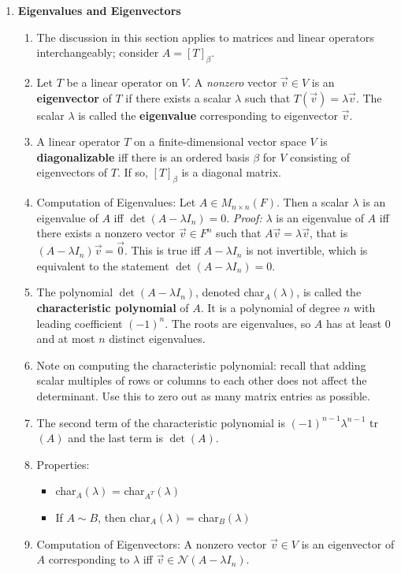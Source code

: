 \documentclass[10pt]{article}
\begin{document}
\begin{multicols*}{2}
\begin{enumerate}
    \item \textbf{Eigenvalues and Eigenvectors}
    \begin{enumerate}
        \item The discussion in this section applies to matrices and linear operators interchangeably; consider $A=[T]_\beta$.
        \item Let $T$ be a linear operator on $V$. A \textit{nonzero} vector $\vec{v} \in V$ is an \textbf{eigenvector} of $T$ if there exists a scalar $\lambda$ such that $T(\vec{v}) = \lambda \vec{v}$. The scalar $\lambda$ is called the \textbf{eigenvalue} corresponding to eigenvector $\vec{v}$.
        \item A linear operator $T$ on a finite-dimensional vector space $V$ is \textbf{diagonalizable} iff there is an ordered basis $\beta$ for $V$ consisting of eigenvectors of $T$. If so, $[T]_\beta$ is a diagonal matrix.
        \item Computation of Eigenvalues: Let $A \in M_{n \times n}(F)$. Then a scalar $\lambda$ is an eigenvalue of $A$ iff $\det(A - \lambda I_n)=0$. \textit{Proof:} $\lambda$ is an eigenvalue of $A$ iff there exists a nonzero vector $\vec{v} \in F^n$ such that $A\vec{v} = \lambda \vec{v}$, that is $(A - \lambda I_n)\vec{v}=\vec{0}$. This is true iff $A - \lambda I_n$ is not invertible, which is equivalent to the statement $\det(A - \lambda I_n)=0$.
        \item The polynomial $\det(A - \lambda I_n)$, denoted char$_A(\lambda)$, is called the \textbf{characteristic polynomial} of $A$. It is a polynomial of degree $n$ with leading coefficient $(-1)^n$. The roots are eigenvalues, so $A$ has at least 0 and at most $n$ distinct eigenvalues.
        \item Note on computing the characteristic polynomial: recall that adding scalar multiples of rows or columns to each other does not affect the determinant. Use this to zero out as many matrix entries as possible. 
        \item The second term of the characteristic polynomial is $(-1)^{n-1} \lambda^{n-1}$ tr$(A)$ and the last term is $\det(A)$.
        \item Properties:
        \begin{itemize}
            \item char$_A(\lambda)$ = char$_{A^T}(\lambda)$
            \item If $A \sim B$, then char$_A(\lambda)$ = char$_{B}(\lambda)$
        \end{itemize}
        \item Computation of Eigenvectors: A nonzero vector $\vec{v} \in V$ is an eigenvector of $A$ corresponding to $\lambda$ iff $\vec{v} \in \mathcal{N}(A-\lambda I_n)$. 

\end{enumerate}
\end{enumerate}
\end{multicols*}
\end{document}
